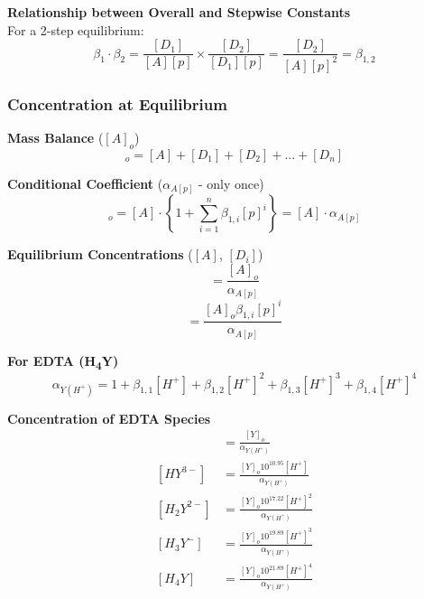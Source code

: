 \vspace{5mm}

\textbf{Relationship between Overall and Stepwise Constants}\\
For a 2-step equilibrium:
\begin{equation}
\beta_1 \cdot \beta_2 = \frac{[D_1]}{[A][p]} \times \frac{[D_2]}{[D_1][p]} = \frac{[D_2]}{[A][p]^2} = \beta_{1,2}
\end{equation}

\subsubsection*{Concentration at Equilibrium}

\textbf{Mass Balance} ($[A]_o$)
\begin{equation}
[A]_o = [A] + [D_1] + [D_2] + \ldots + [D_n]
\end{equation}

\textbf{Conditional Coefficient} ($\alpha_{A[p]}$ - only once)
\begin{equation}
[A]_o = [A] \cdot \left\{1 + \sum_{i=1}^{n} \beta_{1,i}[p]^i\right\} = [A] \cdot \alpha_{A[p]}
\end{equation}

\textbf{Equilibrium Concentrations} ($[A]$, $[D_i]$)
\begin{equation}
[A] = \frac{[A]_o}{\alpha_{A[p]}}
\end{equation}
\begin{equation}
[D_i] = \frac{[A]_o \beta_{1,i}[p]^i}{\alpha_{A[p]}}
\end{equation}

\vspace{5mm}

\textbf{For EDTA (H\textsubscript{4}Y)}
\begin{equation}
\alpha_{Y(H^+)} = 1 + \beta_{1,1}[H^+] + \beta_{1,2}[H^+]^2 + \beta_{1,3}[H^+]^3 + \beta_{1,4}[H^+]^4
\end{equation}

\textbf{Concentration of EDTA Species}
\begin{align}
[Y^{4-}] &= \frac{[Y]_o}{\alpha_{Y(H^+)}} \\
[HY^{3-}] &= \frac{[Y]_o 10^{10.95} [H^+]}{\alpha_{Y(H^+)}} \\
[H_2Y^{2-}] &= \frac{[Y]_o 10^{17.22} [H^+]^2}{\alpha_{Y(H^+)}} \\
[H_3Y^-] &= \frac{[Y]_o 10^{19.89} [H^+]^3}{\alpha_{Y(H^+)}} \\
[H_4Y] &= \frac{[Y]_o 10^{21.89} [H^+]^4}{\alpha_{Y(H^+)}}
\end{align}

